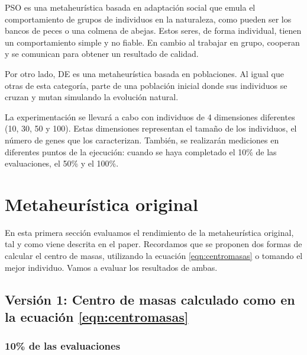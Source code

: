 PSO es una metaheurística basada en adaptación social que emula el comportamiento de grupos de individuos en la naturaleza, como pueden ser los bancos de peces o una colmena de abejas. Estos seres, de forma individual, tienen un comportamiento simple y no fiable. En cambio al trabajar en grupo, cooperan y se comunican para obtener un resultado de calidad.

Por otro lado, DE es una metaheurística basada en poblaciones. Al igual que otras de esta categoría, parte de una población inicial donde sus individuos se cruzan y mutan simulando la evolución natural.

La experimentación se llevará a cabo con individuos de 4 dimensiones diferentes (10, 30, 50 y 100). Estas dimensiones representan el tamaño de los individuos, el número de genes que los caracterizan. También, se realizarán mediciones en diferentes puntos de la ejecución: cuando se haya completado el 10\% de las evaluaciones, el 50\% y el 100\%.


\section{Metaheurística original}
En esta primera sección evaluamos el rendimiento de la metaheurística original, tal y como viene descrita en el paper. Recordamos que se proponen dos formas de calcular el centro de masas, utilizando la ecuación \ref{eqn:centromasas} o tomando el mejor individuo. Vamos a evaluar los resultados de ambas.

\subsection{Versión 1: Centro de masas calculado como en la ecuación \ref{eqn:centromasas}}

\subsubsection*{10\% de las evaluaciones}

